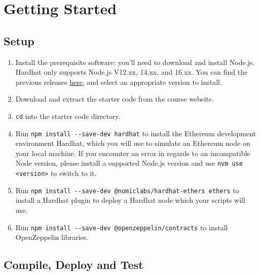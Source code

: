 \documentclass[11pt]{article}
\begin{document}
\section{Getting Started}
\subsection{Setup}
\begin{enumerate}
\item Install the prerequisite software: you'll need to download and install Node.js. Hardhat only supports Node.js V12.xx, 14.xx, and 16.xx. You can find the previous releases \hyperlink{https://nodejs.org/en/download/releases}{here}, and select an appropriate version to install. 

\item Download and extract the starter code from the course website.

\item \verb|cd| into the starter code directory.

\item Run \verb|npm install --save-dev hardhat| to install the Ethereum development environment Hardhat, which you will use to simulate an Ethereum node on your local machine. If you encounter an error in regards to an incompatible Node version, please install a supported Node.js version and use \texttt{nvm use <version>} to switch to it.

\item Run \verb|npm install --save-dev @nomiclabs/hardhat-ethers ethers| to install a Hardhat plugin to deploy a Hardhat node which your scripts will use.

\item Run \verb|npm install --save-dev @openzeppelin/contracts| to install OpenZeppelin libraries. 
\end{enumerate}

\subsection{Compile, Deploy and Test}
\end{document}
